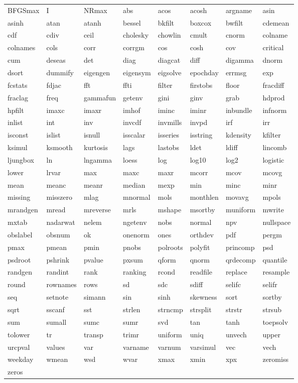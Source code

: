 \begin{tabular}{llllllll}
BFGSmax & I & NRmax & abs & acos & acosh & argname & asin \\
asinh & atan & atanh & bessel & bkfilt & boxcox & bwfilt & cdemean \\
cdf & cdiv & ceil & cholesky & chowlin & cmult & cnorm & colname \\
colnames & cols & corr & corrgm & cos & cosh & cov & critical \\
cum & deseas & det & diag & diagcat & diff & digamma & dnorm \\
dsort & dummify & eigengen & eigensym & eigsolve & epochday & errmsg & exp \\
fcstats & fdjac & fft & ffti & filter & firstobs & floor & fracdiff \\
fraclag & freq & gammafun & getenv & gini & ginv & grab & hdprod \\
hpfilt & imaxc & imaxr & imhof & iminc & iminr & inbundle & infnorm \\
inlist & int & inv & invcdf & invmills & invpd & irf & irr \\
isconst & islist & isnull & isscalar & isseries & isstring & kdensity & kfilter \\
ksimul & ksmooth & kurtosis & lags & lastobs & ldet & ldiff & lincomb \\
ljungbox & ln & lngamma & loess & log & log10 & log2 & logistic \\
lower & lrvar & max & maxc & maxr & mcorr & mcov & mcovg \\
mean & meanc & meanr & median & mexp & min & minc & minr \\
missing & misszero & mlag & mnormal & mols & monthlen & movavg & mpols \\
mrandgen & mread & mreverse & mrls & mshape & msortby & muniform & mwrite \\
mxtab & nadarwat & nelem & ngetenv & nobs & normal & npv & nullspace \\
obslabel & obsnum & ok & onenorm & ones & orthdev & pdf & pergm \\
pmax & pmean & pmin & pnobs & polroots & polyfit & princomp & psd \\
psdroot & pshrink & pvalue & pxsum & qform & qnorm & qrdecomp & quantile \\
randgen & randint & rank & ranking & rcond & readfile & replace & resample \\
round & rownames & rows & sd & sdc & sdiff & selifc & selifr \\
seq & setnote & simann & sin & sinh & skewness & sort & sortby \\
sqrt & sscanf & sst & strlen & strncmp & strsplit & strstr & strsub \\
sum & sumall & sumc & sumr & svd & tan & tanh & toepsolv \\
tolower & tr & transp & trimr & uniform & uniq & unvech & upper \\
urcpval & values & var & varname & varnum & varsimul & vec & vech \\
weekday & wmean & wsd & wvar & xmax & xmin & xpx & zeromiss \\
zeros & \\
\end{tabular}


